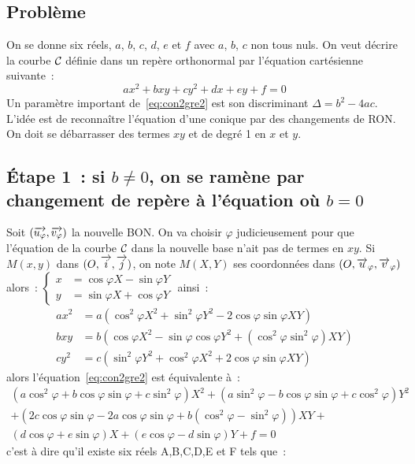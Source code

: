 \subsection{Problème}
On se donne six réels, $a$, $b$, $c$, $d$, $e$ et $f$ avec $a$, $b$, $c$ non tous nuls. On veut décrire la courbe $\mathcal{C}_{{}}$ définie dans un repère orthonormal par l'équation cartésienne suivante~:
\begin{equation}
  ax^2+bxy+cy^2+dx+ey+f=0 \label{eq:con2gre2}
\end{equation}
Un paramètre important de~\eqref{eq:con2gre2} est son discriminant $\Delta=b^2-4ac$. L'idée est de reconnaître l'équation d'une conique par des changements de RON\@. On doit se débarrasser des termes $xy$ et de degré 1 en $x$ et $y$.

\subsection{Étape 1~: si $b\neq 0$, on se ramène par changement de repère à l'équation où $b=0$}
Soit $(\overrightarrow{u_{\varphi}},\overrightarrow{v_{\varphi}})$ la nouvelle BON\@. On va choisir $\varphi$ judicieusement pour que l'équation de la courbe $\mathcal{C}_{{}}$ dans la nouvelle base n'ait pas de termes en $xy$. Si $M(x,y)$ dans $(O,\overrightarrow{i},\overrightarrow{j})$, on note $M(X,Y)$ ses coordonnées dans $(O,\overrightarrow{u}_\varphi,\overrightarrow{v}_\varphi)$ alors~:
$\begin{cases} x&=\cos\varphi X - \sin\varphi Y \\ y&=\sin\varphi X + \cos\varphi Y\end{cases}$ ainsi~:
\begin{align}
  ax^2&=a(\cos^2\varphi X^2 + \sin^2\varphi Y^2 - 2\cos\varphi\sin\varphi XY)\\
  bxy&=b(\cos\varphi X^2 -\sin\varphi\cos\varphi Y^2 + (\cos^2\varphi \sin^2\varphi)XY)\\
  cy^2&=c(\sin^2\varphi Y^2 + \cos^2\varphi X^2 + 2\cos\varphi\sin\varphi XY)
\end{align}
alors l'équation~\eqref{eq:con2gre2} est équivalente à~:
\begin{multline}
 (a\cos^2\varphi + b\cos\varphi\sin\varphi +c\sin^2\varphi)X^2+(a\sin^2\varphi - b\cos\varphi\sin\varphi +c\cos^2\varphi)Y^2\\+(2c\cos\varphi\sin\varphi-2a\cos\varphi\sin\varphi+b(\cos^2\varphi - \sin^2\varphi))XY + \\ (d\cos\varphi + e\sin\varphi)X +(e\cos\varphi - d\sin\varphi)Y +f=0
\end{multline}
c'est à dire qu'il existe six réels A,B,C,D,E et F tels que~:
